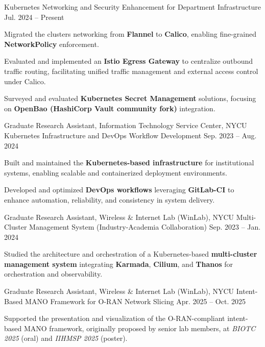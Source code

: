 \begin{cventries}
  {Kubernetes Networking and Security Enhancement for Department Infrastructure} %
  {} %
  {Jul. 2024 -- Present} %
  {
    \begin{cvitems}
      \item {Migrated the clusters networking from \textbf{Flannel} to \textbf{Calico}, enabling fine-grained \textbf{NetworkPolicy} enforcement.}
      \item { Evaluated and implemented an \textbf{Istio Egress Gateway} to centralize outbound traffic routing, facilitating unified traffic management and external access control under Calico.}
      \item {Surveyed and evaluated \textbf{Kubernetes Secret Management} solutions, focusing on \textbf{OpenBao (HashiCorp Vault community fork)} integration.}
    \end{cvitems}
  }

  \cventry
  {Graduate Research Assistant, Information Technology Service Center, NYCU} %
  {Kubernetes Infrastructure and DevOps Workflow Development} %
  {} %
  {Sep. 2023 -- Aug. 2024} %
  {
    \begin{cvitems}
      \item {Built and maintained the \textbf{Kubernetes-based infrastructure} for institutional systems, enabling scalable and containerized deployment environments.}
      \item {Developed and optimized \textbf{DevOps workflows} leveraging \textbf{GitLab-CI} to enhance automation, reliability, and consistency in system delivery.}
    \end{cvitems}
  }

  
  \cventry
    {Graduate Research Assistant, Wireless \& Internet Lab (WinLab), NYCU} %
    {Multi-Cluster Management System (Industry-Academia Collaboration)} %
    {} %
    {Sep. 2023 -- Jan. 2024} %
    {
      \begin{cvitems}
        \item {Studied the architecture and orchestration of a Kubernetes-based \textbf{multi-cluster management system} integrating \textbf{Karmada}, \textbf{Cilium}, and \textbf{Thanos} for orchestration and observability.}
      \end{cvitems}
    }

    
  \cventry
    {Graduate Research Assistant, Wireless \& Internet Lab (WinLab), NYCU} %
    {Intent-Based MANO Framework for O-RAN Network Slicing} %
    {} %
    {Apr. 2025 -- Oct. 2025} %
    {
      \begin{cvitems}
        \item {Supported the presentation and visualization of the O-RAN-compliant intent-based MANO framework, originally proposed by senior lab members, at \textit{BIOTC 2025} (oral) and \textit{IIHMSP 2025} (poster).}
      \end{cvitems}
    }
 
\end{cventries}
